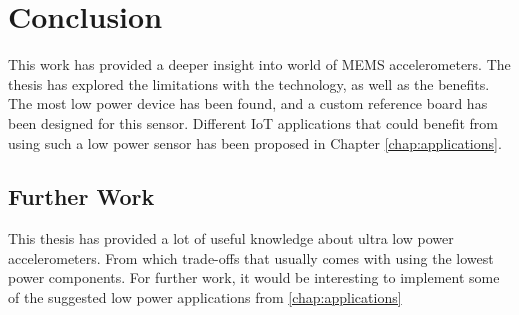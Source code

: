 \chapter{Conclusion}

This work has provided a deeper insight into world of MEMS accelerometers. The thesis has explored the limitations with the technology, as well as the benefits. The most low power device has been found, and a custom reference board has been designed for this sensor. Different IoT applications that could benefit from using such a low power sensor has been proposed in Chapter \ref{chap:applications}. 

\section{Further Work}

This thesis has provided a lot of useful knowledge about ultra low power accelerometers. From which trade-offs that usually comes with using the lowest power components. For further work, it would be interesting to implement some of the suggested low power applications from \ref{chap:applications}
